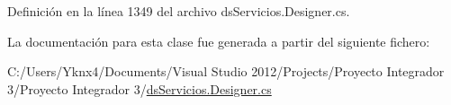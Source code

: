 Definición en la línea 1349 del archivo ds\-Servicios.\-Designer.\-cs.



La documentación para esta clase fue generada a partir del siguiente fichero\-:\begin{DoxyCompactItemize}
\item 
C\-:/\-Users/\-Yknx4/\-Documents/\-Visual Studio 2012/\-Projects/\-Proyecto Integrador 3/\-Proyecto Integrador 3/\hyperlink{ds_servicios_8_designer_8cs}{ds\-Servicios.\-Designer.\-cs}\end{DoxyCompactItemize}
